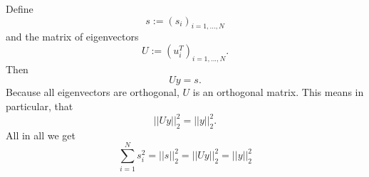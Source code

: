 \documentclass[a4paper]{article}
\newcommand{\1}{\mathds{1}}
\begin{document}
Define \[ s:=(s_i)_{i=1,...,N}\] and the matrix of eigenvectors \[ U:=(u^T_i)_{i=1,...,N}. \]
Then \[ Uy=s. \]
Because all eigenvectors are orthogonal, $U$ is an orthogonal matrix. This means in particular, that \[||Uy||^2_2=||y||^2_2. \] 
All in all we get \[ \sum_{i=1}^{N}s_i^2=||s||^2_2=||Uy||^2_2=||y||^2_2 \]
\end{document}
